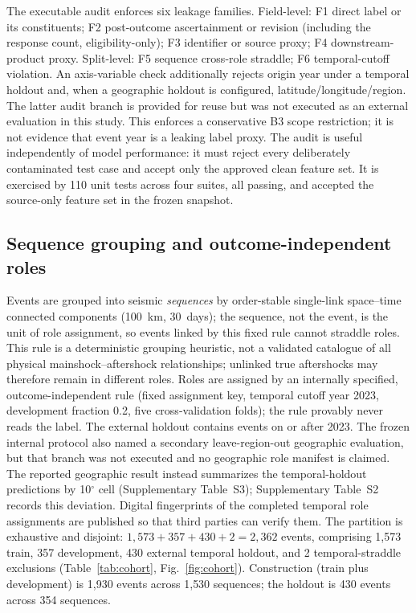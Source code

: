\documentclass[pdflatex,sn-basic,Numbered]{sn-jnl}
\begin{document}
The executable audit enforces six leakage families. Field-level: F1 direct
label or its constituents; F2 post-outcome ascertainment or revision (including
the response count, eligibility-only); F3 identifier or source proxy; F4
downstream-product proxy. Split-level: F5 sequence cross-role straddle; F6
temporal-cutoff violation. An axis-variable check additionally rejects origin year
under a temporal holdout and, when a geographic holdout is configured,
latitude/longitude/region. The latter audit branch is provided for reuse but was
not executed as an external evaluation in this study. This enforces a
conservative B3 scope restriction; it is not evidence that event year is a
leaking label proxy. The audit is useful independently of
model performance: it must reject every deliberately contaminated test case and
accept only the approved clean feature set. It is exercised by 110 unit tests
across four suites, all passing, and accepted the source-only feature set in the
frozen snapshot.

\subsection{Sequence grouping and outcome-independent roles}\label{sec:roles}

Events are grouped into seismic \emph{sequences} by order-stable single-link
space--time connected components (100~km, 30~days); the sequence, not the event,
is the unit of role assignment, so events linked by this fixed rule cannot
straddle roles. This rule is a deterministic grouping heuristic, not a validated
catalogue of all physical mainshock--aftershock relationships; unlinked true
aftershocks may therefore remain in different roles. Roles are
assigned by an internally specified, outcome-independent rule (fixed assignment key,
temporal cutoff year 2023, development fraction 0.2, five cross-validation
folds); the rule provably never reads the label. The external holdout contains
events on or after 2023. The frozen internal protocol also named a secondary
leave-region-out geographic evaluation, but that branch was not executed and no
geographic role manifest is claimed. The reported geographic result instead
summarizes the temporal-holdout predictions by 10$^\circ$ cell
(Supplementary Table~S3); Supplementary Table~S2 records this deviation.
Digital fingerprints of the completed temporal role assignments are published
so that third parties can verify them. The
partition is exhaustive and disjoint:
$1{,}573+357+430+2=2{,}362$ events, comprising 1{,}573 train, 357 development,
430 external temporal holdout, and 2 temporal-straddle exclusions
(Table~\ref{tab:cohort}, Fig.~\ref{fig:cohort}). Construction (train plus
development) is 1{,}930 events across 1{,}530 sequences; the holdout is 430
events across 354 sequences.
\end{document}
